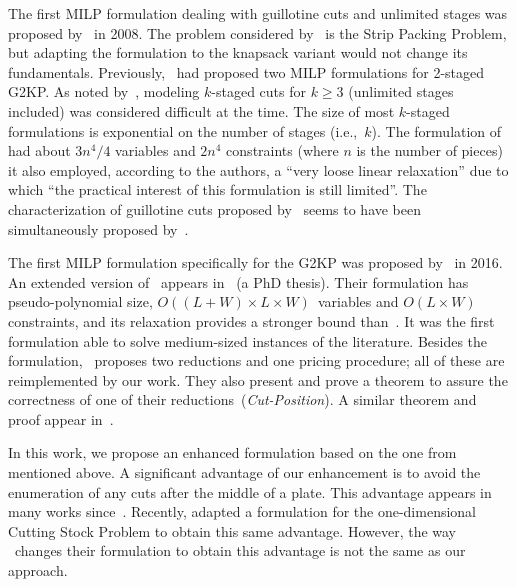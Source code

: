 \documentclass[smallextended]{svjour3}       %
\begin{document}
The first MILP formulation dealing with guillotine cuts and unlimited stages was proposed by~\cite{messaoud:2008} in 2008.
The problem considered by~\cite{messaoud:2008} is the Strip Packing Problem, but adapting the formulation to the knapsack variant would not change its fundamentals.
Previously, \cite{lodi:2003}~had proposed two MILP formulations for 2-staged G2KP.
As noted by~\cite{belov_thesis:2003}, modeling \(k\)-staged cuts for \(k \geq 3\) (unlimited stages included) was considered difficult at the time.
The size of most \(k\)-staged formulations is exponential on the number of stages (i.e.,~\(k\)).
The formulation of~\cite{messaoud:2008} had about \(3n^4/4\) variables and \(2n^4\) constraints (where \(n\) is the number of pieces) it also employed, according to the authors, a ``very loose linear relaxation'' due to which ``the practical interest of this formulation is still limited''.
The characterization of guillotine cuts proposed by~\cite{messaoud:2008} seems to have been simultaneously proposed by~\cite{pisinger:2007}. %

The first MILP formulation specifically for the G2KP was proposed by~\cite{furini:2016} in 2016.
An extended version of~\cite{furini:2016} appears in~\cite{dimitri_thesis} (a PhD thesis).
Their formulation has pseudo-polynomial size, \(O((L + W) \times L \times W)\)~variables and \(O(L \times W)\) constraints, and its relaxation provides a stronger bound than~\cite{messaoud:2008}.
It was the first formulation able to solve medium-sized instances of the literature.
Besides the formulation, \cite{furini:2016}~proposes two reductions and one pricing procedure; all of these are reimplemented by our work.
They also present and prove a theorem to assure the correctness of one of their reductions~(\emph{Cut-Position}).
A similar theorem and proof appear in~\cite{song:2010}.

In this work, we propose an enhanced formulation based on the one from \cite{furini:2016} mentioned above.
A significant advantage of our enhancement is to avoid the enumeration of any cuts after the middle of a plate.
This advantage appears in many works since~\cite{herz:1972}.
Recently, \cite{delorme:2019} adapted a formulation for the one-dimensional Cutting Stock Problem to obtain this same advantage.
However, the way \cite{delorme:2019}~changes their formulation to obtain this advantage is not the same as our approach.
\end{document}
